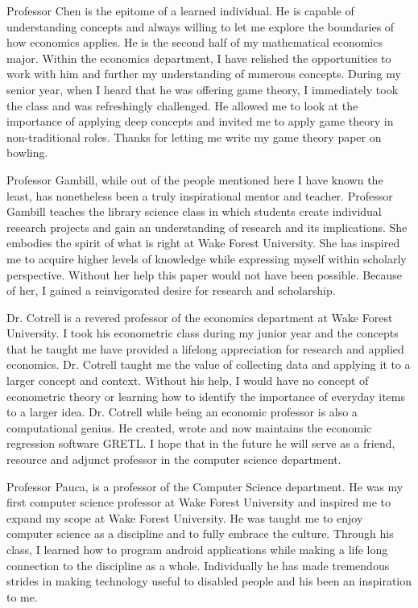 \documentclass[paper=letter, fontsize=11pt]{scrartcl}
\numberwithin{equation}{section}		%
\numberwithin{figure}{section}			%
\numberwithin{table}{section}				%
\begin{document}
\begin{spacing}{2}
Professor Chen is the epitome of a learned individual. He is capable of understanding concepts and always willing to let me explore the boundaries of how economics applies. He is the second half of my mathematical economics major. Within the economics department, I have relished the opportunities to work with him and further my understanding of numerous concepts. During my senior year, when I heard that he was offering game theory, I immediately took the class and was refreshingly challenged. He allowed me to look at the importance of applying deep concepts and invited me to apply game theory in non-traditional roles. Thanks for letting me write my game theory paper on bowling. 

Professor Gambill, while out of the people mentioned here I have known the least, has nonetheless been a truly inspirational mentor and teacher. Professor Gambill teaches the library science class in which students create individual research projects and gain an understanding of research and its implications. She embodies the spirit of what is right at Wake Forest University. She has inspired me to acquire higher levels of knowledge while expressing myself within scholarly perspective. Without her help this paper would not have been possible. Because of her, I gained a reinvigorated desire for research and scholarship. 

Dr. Cotrell is a revered professor of the economics department at Wake Forest University. I took his econometric class during my junior year and the concepts that he taught me have provided a lifelong appreciation for research and applied economics. Dr. Cotrell taught me the value of collecting data and applying it to a larger concept and context. Without his help, I would have no concept of econometric theory or learning how to identify the importance of everyday items to a larger idea. Dr. Cotrell while being an economic professor is also a computational genius. He created, wrote and now maintains the economic regression software GRETL. I hope that in the future he will serve as a friend, resource and adjunct professor in the computer science department. 

Professor Pauca, is a professor of the Computer Science department. He was my first computer science professor at Wake Forest University and inspired me to expand my scope at Wake Forest University. He was taught me to enjoy computer science as a discipline and to fully embrace the culture. Through his class, I learned how to program android applications while making a life long connection to the discipline as a whole. Individually he has made tremendous strides in making technology useful to disabled people and his been an inspiration to me. 


\end{spacing}
\end{document}
